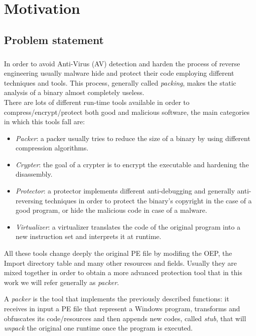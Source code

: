 \chapter{Motivation}
\label{chapter2}
\thispagestyle{empty}

\section{Problem statement}
\paragraph{}
In order to avoid Anti-Virus (AV) detection and harden the process of reverse engineering usually malware hide and protect their code employing different techniques and tools. This process, generally called \textit{packing}, makes the static analysis of a binary almost completely useless.\\There are lots of different run-time tools available in order to compress/encrypt/protect both good and malicious software, the main categories in which this tools fall are:
\begin{itemize}
\item \emph{Packer}: a packer usually tries to reduce the size of a binary by using different compression algorithms.
\item \emph{Crypter}: the goal of a crypter is to encrypt the executable and hardening the disassembly.
\item \emph{Protector}: a protector implements different anti-debugging and generally anti-reversing techniques in order to protect the binary's copyright in the case of a good program, or hide the malicious code in case of a malware.
\item \emph{Virtualizer}: a virtualizer translates the code of the original program into a new  instruction set and  interprets it at runtime.
\end{itemize}

All these tools change deeply the original PE file by modifing the OEP, the Import directory table and many other resources and fields. Usually they are mixed together in order to obtain a more advanced protection tool that in this work we will refer generally as \textit{packer}.

A \textit{packer} is the tool that implements the previously described functions: it receives in input a PE file that represent a Windows program, transforms and obfuscates its code/resources and then appends new codes, called \textit{stub}, that will \textit{unpack} the original one runtime once the program is executed.\\\\

